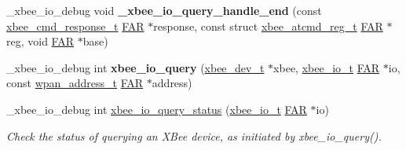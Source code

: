 \begin{DoxyCompactItemize}
\item 
\hypertarget{group__xbee__io_gab1a374b17b64343fec98a0c2fc419df4}{\-\_\-xbee\-\_\-io\-\_\-debug void {\bfseries \-\_\-xbee\-\_\-io\-\_\-query\-\_\-handle\-\_\-end} (const \hyperlink{structxbee__cmd__response__t}{xbee\-\_\-cmd\-\_\-response\-\_\-t} \hyperlink{group__hal_gaef060b3456fdcc093a7210a762d5f2ed}{F\-A\-R} $\ast$response, const struct \hyperlink{structxbee__atcmd__reg__t}{xbee\-\_\-atcmd\-\_\-reg\-\_\-t} \hyperlink{group__hal_gaef060b3456fdcc093a7210a762d5f2ed}{F\-A\-R} $\ast$reg, void \hyperlink{group__hal_gaef060b3456fdcc093a7210a762d5f2ed}{F\-A\-R} $\ast$base)}\label{group__xbee__io_gab1a374b17b64343fec98a0c2fc419df4}

\item 
\hypertarget{group__xbee__io_ga730672b8c2d615d0cd3a4083e673e6e8}{\-\_\-xbee\-\_\-io\-\_\-debug int {\bfseries xbee\-\_\-io\-\_\-query} (\hyperlink{structxbee__dev__t}{xbee\-\_\-dev\-\_\-t} $\ast$xbee, \hyperlink{structxbee__io__t}{xbee\-\_\-io\-\_\-t} \hyperlink{group__hal_gaef060b3456fdcc093a7210a762d5f2ed}{F\-A\-R} $\ast$io, const \hyperlink{structwpan__address__t}{wpan\-\_\-address\-\_\-t} \hyperlink{group__hal_gaef060b3456fdcc093a7210a762d5f2ed}{F\-A\-R} $\ast$address)}\label{group__xbee__io_ga730672b8c2d615d0cd3a4083e673e6e8}

\item 
\-\_\-xbee\-\_\-io\-\_\-debug int \hyperlink{group__xbee__io_gad253478285335c84b310aafb13aa1b21}{xbee\-\_\-io\-\_\-query\-\_\-status} (\hyperlink{structxbee__io__t}{xbee\-\_\-io\-\_\-t} \hyperlink{group__hal_gaef060b3456fdcc093a7210a762d5f2ed}{F\-A\-R} $\ast$io)
\begin{DoxyCompactList}\small\item\em Check the status of querying an X\-Bee device, as initiated by xbee\-\_\-io\-\_\-query(). \end{DoxyCompactList}\end{DoxyCompactItemize}
